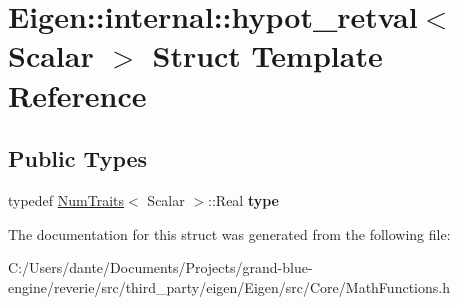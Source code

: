 \hypertarget{struct_eigen_1_1internal_1_1hypot__retval}{}\section{Eigen\+::internal\+::hypot\+\_\+retval$<$ Scalar $>$ Struct Template Reference}
\label{struct_eigen_1_1internal_1_1hypot__retval}
\subsection*{Public Types}
\begin{DoxyCompactItemize}
\item 
\mbox{\label{struct_eigen_1_1internal_1_1hypot__retval_a8207482b82ba83b9ac096e043c65485b}} 
typedef \mbox{\hyperlink{struct_eigen_1_1_num_traits}{Num\+Traits}}$<$ Scalar $>$\+::Real {\bfseries type}
\end{DoxyCompactItemize}


The documentation for this struct was generated from the following file\+:\begin{DoxyCompactItemize}
\item 
C\+:/\+Users/dante/\+Documents/\+Projects/grand-\/blue-\/engine/reverie/src/third\+\_\+party/eigen/\+Eigen/src/\+Core/Math\+Functions.\+h\end{DoxyCompactItemize}

